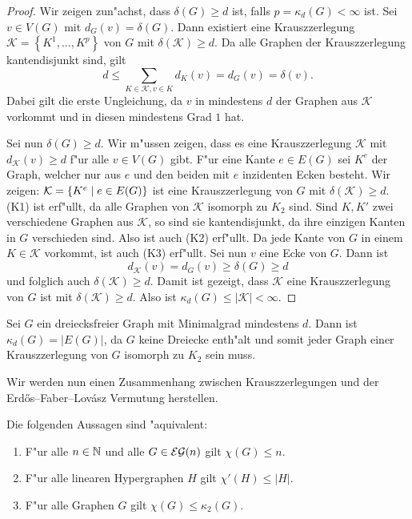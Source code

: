 \begin{proof}
  Wir zeigen zun"achst, dass $\delta(G) \geq d$ ist, falls $p = \kappa_d(G) < \infty$ ist. Sei $v\in V(G)$ mit $d_{G}(v) = \delta(G)$. Dann existiert eine Krauszzerlegung $\mathcal{K}=\left\{ K^{1}, \dots , K^{p} \right\}$ von $G$ mit $\delta(\mathcal{K}) \geq d$. Da alle Graphen der Krauszzerlegung kantendisjunkt sind, gilt 
  $$ d \leq \sum\limits_{K\in \mathcal{K}, v\in K} d_{K}(v) = d_{G}(v) = \delta(v).$$
  Dabei gilt die erste Ungleichung, da $v$ in mindestens $d$ der Graphen aus $\mathcal{K}$ vorkommt und in diesen mindestens Grad $1$ hat.

  Sei nun $\delta(G) \geq d$. Wir m"ussen zeigen, dass es eine Krauszzerlegung $\mathcal{K}$ mit
  $d_{\mathcal{K}}(v) \geq d$ f"ur alle $v\in V(G)$ gibt. 
  F"ur eine Kante $e\in E(G)$ sei $K^{e}$ der Graph, welcher nur aus $e$ und den beiden mit $e$ inzidenten Ecken besteht. Wir zeigen:  $\mathcal{K} = \{K^e \;|\; e\in E(G) \}$ ist eine Krauszzerlegung von $G$ mit $\delta(\mathcal{K}) \geq d$.
  (K1) ist erf"ullt, da alle Graphen von $\mathcal{K}$ isomorph zu $K_{2}$ sind. Sind $K,K'$ zwei verschiedene Graphen aus $\mathcal{K}$, so sind sie kantendisjunkt, da ihre einzigen Kanten in $G$ verschieden sind. 
  Also ist auch (K2) erf"ullt. Da jede Kante von $G$ in einem $K\in \mathcal{K}$ vorkommt, ist auch (K3) erf"ullt. Sei nun $v$ eine Ecke von $G$. Dann ist $$d_{\mathcal{K}}(v) = d_{G}(v) \geq \delta(G) \geq d$$ und folglich auch $\delta(\mathcal{K}) \geq d$. Damit ist gezeigt, dass $\mathcal{K}$ eine Krauszzerlegung von $G$ ist mit $\delta\left( \mathcal{K} \right) \geq d$. Also ist
  $\kappa_{d}(G) \leq |\mathcal{K}| <
  \infty$.
\end{proof}

\begin{example}
  Sei $G$ ein dreiecksfreier Graph mit Minimalgrad mindestens $d$. Dann ist $\kappa_{d}(G) = |E(G)|$, da $G$ keine Dreiecke enth"alt und somit jeder Graph einer Krauszzerlegung von $G$ isomorph zu $K_{2}$ sein muss. 
\end{example}

Wir werden nun einen Zusammenhang zwischen Krauszzerlegungen und der Erd\H{o}s--Faber--Lov\'asz Vermutung herstellen.

\begin{theorem}
  Die folgenden Aussagen sind "aquivalent:
  \begin{enumerate}[label=\rm{(\alph*)}]
    \item F"ur alle $n\in{\mathbb{N}}$ und alle $G\in{\cal EG}(n)$ gilt $\chi(G) \leq n$.
    \item F"ur alle linearen Hypergraphen $H$ gilt $\chi'(H) \leq |H|$.
    \item F"ur alle Graphen $G$ gilt $\chi(G) \leq \kappa_{2}(G)$.
  \end{enumerate}
  \label{thm:equivefl}
\end{theorem}

